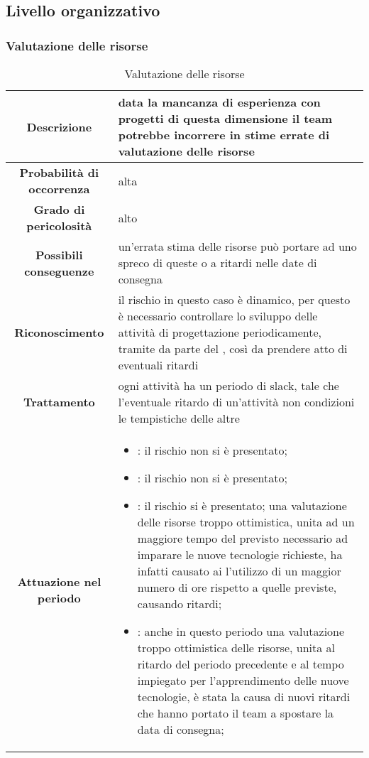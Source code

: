 \documentclass[PianoDiProgetto.tex]{subfiles}
\begin{document}
\clearpage		
	\subsection{Livello organizzativo}
	\subsubsection{Valutazione delle risorse}
		\label{sec:lo}
		
		
\begin{table}[h]
		\begin{center}
			\begin{tabular}{ | c | p{10cm} |}
				\hline		
		
		 \textbf{Descrizione} & data la mancanza di esperienza con progetti di questa dimensione il team potrebbe incorrere in stime errate di valutazione delle risorse \\ \hline
		 \textbf{Probabilità di occorrenza} & alta \\ \hline
		 \textbf{Grado di pericolosità} & alto \\ \hline
		 \textbf{Possibili conseguenze} & un'errata stima delle risorse può portare ad uno spreco di queste o a ritardi nelle date di consegna \\ \hline
		 \textbf{Riconoscimento} & il rischio in questo caso è dinamico, per questo è necessario controllare lo sviluppo delle attività di progettazione periodicamente, tramite  \gl{verifica} da parte del \RESP{}, così da prendere atto di eventuali ritardi \\ \hline
		 \textbf{Trattamento} & ogni attività ha un periodo di slack, tale che l'eventuale ritardo di un'attività non condizioni le tempistiche delle altre \\ \hline
		 \textbf{Attuazione nel periodo} &
			\begin{itemize}
				\item \PerAR : il rischio non si è presentato;
				\item \PerAD: il rischio non si è presentato;
				\item \PerPA: il rischio si è presentato; una valutazione delle risorse troppo ottimistica, unita ad un maggiore tempo del previsto necessario ad imparare le nuove tecnologie richieste, ha infatti causato ai \PJP{} l'utilizzo di un maggior numero di ore rispetto a quelle previste, causando ritardi;
				\item \PerPD: anche in questo periodo una valutazione troppo ottimistica delle risorse, unita al ritardo del periodo precedente e al tempo impiegato per l'apprendimento delle nuove tecnologie, è stata la causa di nuovi ritardi che hanno portato il team a spostare la data di consegna; 
			\end{itemize}
			\\ \hline
	
		\end{tabular}
		\caption{Valutazione delle risorse}
		\end{center}	
	\end{table}	
	
\end{document}
